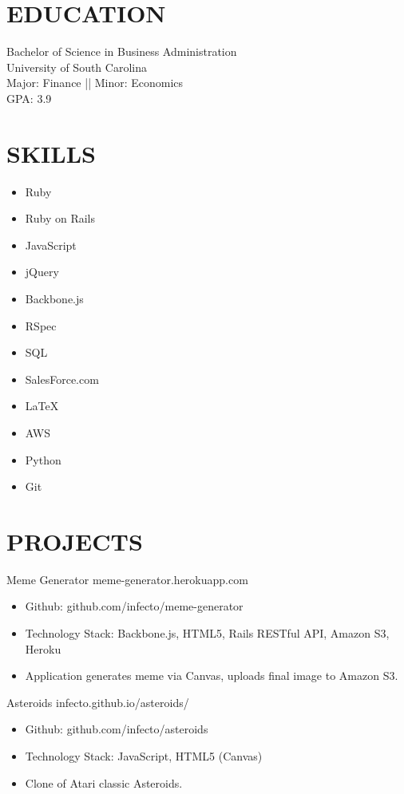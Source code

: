 \documentclass[line, margin]{res}
\begin{document}
\address{San Francisco Bay Area\\ (843) 696-9395\\ drew.kowalik@gmail.com}

\begin{resume}
\section{EDUCATION}
 Bachelor of Science in Business Administration\\
 University of South Carolina\\
 Major: Finance || Minor: Economics\\
 GPA: 3.9
 
\section{SKILLS}
\begin{multicols}{4}
\begin{itemize}[leftmargin=10pt]
\item Ruby
\item Ruby on Rails
\item JavaScript
\item jQuery
\item Backbone.js
\item RSpec
\item SQL
\item SalesForce.com
\item \LaTeX
\item AWS
\item Python
\item Git
\end{itemize}
\end{multicols}

\section{PROJECTS}
{\large Meme Generator} \hfill meme-generator.herokuapp.com
\begin{itemize}[leftmargin=10pt]
\item Github: github.com/infecto/meme-generator
\item Technology Stack: Backbone.js, HTML5, Rails RESTful API, Amazon S3, Heroku
\item Application generates meme via Canvas, uploads final image to Amazon S3.
\end{itemize}

{\large Asteroids} \hfill infecto.github.io/asteroids/
\begin{itemize}[leftmargin=10pt]
\item Github: github.com/infecto/asteroids
\item Technology Stack: JavaScript, HTML5 (Canvas)
\item Clone of Atari classic Asteroids.
\end{itemize}


\end{resume}
\end{document}
